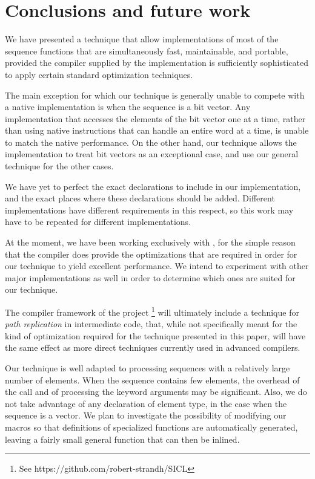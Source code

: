 \section{Conclusions and future work}

We have presented a technique that allow implementations of most of
the \commonlisp{} sequence functions that are simultaneously fast,
maintainable, and portable, provided the compiler supplied by the
implementation is sufficiently sophisticated to apply certain standard
optimization techniques.

The main exception for which our technique is generally unable to
compete with a native implementation is when the sequence is a bit
vector.  Any implementation that accesses the elements of the bit
vector one at a time, rather than using native instructions that can
handle an entire word at a time, is unable to match the native
performance.  On the other hand, our technique allows the
\commonlisp{} implementation to treat bit vectors as an exceptional
case, and use our general technique for the other cases.

We have yet to perfect the exact declarations to include in our
implementation, and the exact places where these declarations should
be added.  Different \commonlisp{} implementations have different
requirements in this respect, so this work may have to be repeated for
different implementations.

At the moment, we have been working exclusively with \sbcl{}, for the
simple reason that the \sbcl{} compiler does provide the optimizations
that are required in order for our technique to yield excellent
performance.  We intend to experiment with other major implementations
as well in order to determine which ones are suited for our
technique.

The \cleavir{} compiler framework of the \sicl{} project%
\footnote{See https://github.com/robert-strandh/SICL} will ultimately
include a technique for \emph{path replication} in intermediate code,
that, while not specifically meant for the kind of optimization
required for the technique presented in this paper, will have the same
effect as more direct techniques currently used in advanced
compilers.

Our technique is well adapted to processing sequences with a
relatively large number of elements.  When the sequence contains few
elements, the overhead of the call and of processing the keyword
arguments may be significant.  Also, we do not take advantage of any
declaration of element type, in the case when the sequence is a
vector.  We plan to investigate the possibility of modifying our
macros so that definitions of specialized functions are automatically
generated, leaving a fairly small general function that can then be
inlined.
